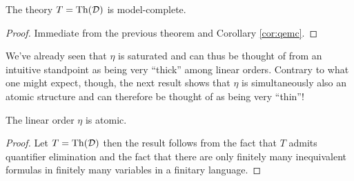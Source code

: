 \begin{cor} The theory $T=\operatorname{Th}(\mathcal{D})$ is model-complete.
\end{cor}
\begin{proof} Immediate from the previous theorem and Corollary \ref{cor:qemc}.
\end{proof}

We've already seen that $\eta$ is saturated and can thus be thought of from an
intuitive standpoint as being very ``thick'' among linear orders.  Contrary to
what one might expect, though, the next result shows that $\eta$ is
simultaneously also an atomic structure and can therefore be thought of as being
very ``thin''!

\begin{prp} The linear order $\eta$ is atomic.
\end{prp}
\begin{proof} Let $T=\operatorname{Th}(\mathcal{D})$ then the result follows from the fact that $T$
	admits quantifier elimination and the fact that there are only finitely many
	inequivalent formulas in finitely many variables in a finitary language.
\end{proof}
